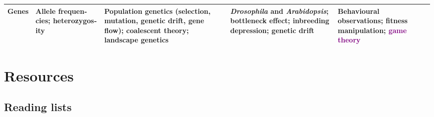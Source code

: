 \documentclass[english,11pt,a4paper, landscape]{article}
\begin{document}
\begin{tabularx}{\textwidth}{p{2cm}>{\raggedright\arraybackslash}X>{\raggedright\arraybackslash}X>{\raggedright\arraybackslash}X|>{\raggedright\arraybackslash}X}
\rowcolor{lightgray}
\textbf{Genes} & Allele frequen­cies; heterozygos­ity & Population genetics (selection, mutation, genetic drift, gene flow); coalescent the­ory; landscape genetics & \emph{Drosophila} and \emph{Ara­bidopsis}; bottleneck effect; in­breeding depression; genetic drift & Behavioural observations; fitness manipulation; \textcolor{purple}{game theory} \\ \hline
\end{tabularx}

\section{Resources}

\subsection{Reading lists}
\end{document}
